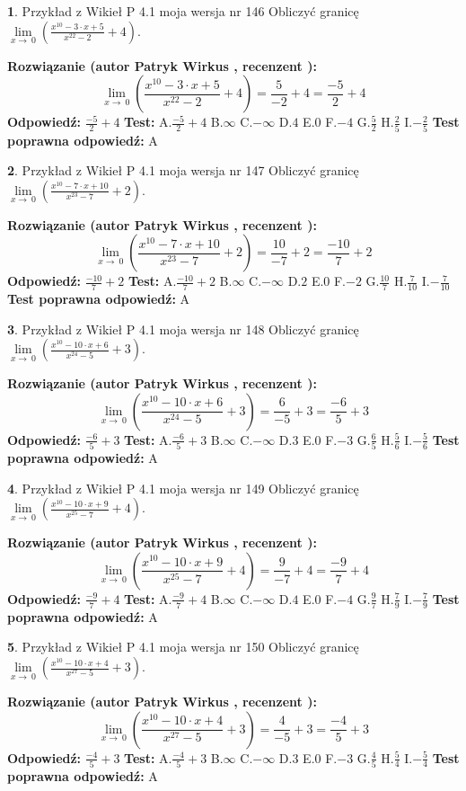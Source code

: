 \documentclass[12pt, a4paper]{article}
\theoremstyle{definition} %
\newtheorem{zad}{}
\newcommand{\zadStart}[1]{\begin{zad}#1\newline}
\newcommand{\zadStop}{\end{zad}}
\newcommand{\rozwStart}[2]{\noindent \textbf{Rozwiązanie (autor #1 , recenzent #2): }\newline}
\newcommand{\rozwStop}{\newline}
\newcommand{\odpStart}{\noindent \textbf{Odpowiedź:}\newline}
\newcommand{\odpStop}{\newline}
\newcommand{\testStart}{\noindent \textbf{Test:}\newline}
\newcommand{\testStop}{\newline}
\newcommand{\kluczStart}{\noindent \textbf{Test poprawna odpowiedź:}\newline}
\newcommand{\kluczStop}{\newline}
\begin{document}
\zadStart{Przykład z Wikieł P 4.1 moja wersja nr 146}
Obliczyć granicę $\lim\limits_{x\to\ 0}(\frac{x^{10}-3 \cdot x +5}{x^{22}-2}+4)$.
\zadStop
\rozwStart{Patryk Wirkus}{}
$$\lim\limits_{x\to\ 0}(\frac{x^{10}-3 \cdot x +5}{x^{22}-2}+4)=\frac{5}{-2}+4=\frac{-5}{2}+4$$
\rozwStop
\odpStart
$\frac{-5}{2}+4$
\odpStop
\testStart
A.$\frac{-5}{2}+4$
B.$\infty$
C.$-\infty$
D.$4$
E.$0$
F.$-4$
G.$\frac{5}{2}$
H.$\frac{2}{5}$
I.$-\frac{2}{5}$
\testStop
\kluczStart
A
\kluczStop



\zadStart{Przykład z Wikieł P 4.1 moja wersja nr 147}
Obliczyć granicę $\lim\limits_{x\to\ 0}(\frac{x^{10}-7 \cdot x +10}{x^{23}-7}+2)$.
\zadStop
\rozwStart{Patryk Wirkus}{}
$$\lim\limits_{x\to\ 0}(\frac{x^{10}-7 \cdot x +10}{x^{23}-7}+2)=\frac{10}{-7}+2=\frac{-10}{7}+2$$
\rozwStop
\odpStart
$\frac{-10}{7}+2$
\odpStop
\testStart
A.$\frac{-10}{7}+2$
B.$\infty$
C.$-\infty$
D.$2$
E.$0$
F.$-2$
G.$\frac{10}{7}$
H.$\frac{7}{10}$
I.$-\frac{7}{10}$
\testStop
\kluczStart
A
\kluczStop



\zadStart{Przykład z Wikieł P 4.1 moja wersja nr 148}
Obliczyć granicę $\lim\limits_{x\to\ 0}(\frac{x^{10}-10 \cdot x +6}{x^{24}-5}+3)$.
\zadStop
\rozwStart{Patryk Wirkus}{}
$$\lim\limits_{x\to\ 0}(\frac{x^{10}-10 \cdot x +6}{x^{24}-5}+3)=\frac{6}{-5}+3=\frac{-6}{5}+3$$
\rozwStop
\odpStart
$\frac{-6}{5}+3$
\odpStop
\testStart
A.$\frac{-6}{5}+3$
B.$\infty$
C.$-\infty$
D.$3$
E.$0$
F.$-3$
G.$\frac{6}{5}$
H.$\frac{5}{6}$
I.$-\frac{5}{6}$
\testStop
\kluczStart
A
\kluczStop



\zadStart{Przykład z Wikieł P 4.1 moja wersja nr 149}
Obliczyć granicę $\lim\limits_{x\to\ 0}(\frac{x^{10}-10 \cdot x +9}{x^{25}-7}+4)$.
\zadStop
\rozwStart{Patryk Wirkus}{}
$$\lim\limits_{x\to\ 0}(\frac{x^{10}-10 \cdot x +9}{x^{25}-7}+4)=\frac{9}{-7}+4=\frac{-9}{7}+4$$
\rozwStop
\odpStart
$\frac{-9}{7}+4$
\odpStop
\testStart
A.$\frac{-9}{7}+4$
B.$\infty$
C.$-\infty$
D.$4$
E.$0$
F.$-4$
G.$\frac{9}{7}$
H.$\frac{7}{9}$
I.$-\frac{7}{9}$
\testStop
\kluczStart
A
\kluczStop



\zadStart{Przykład z Wikieł P 4.1 moja wersja nr 150}
Obliczyć granicę $\lim\limits_{x\to\ 0}(\frac{x^{10}-10 \cdot x +4}{x^{27}-5}+3)$.
\zadStop
\rozwStart{Patryk Wirkus}{}
$$\lim\limits_{x\to\ 0}(\frac{x^{10}-10 \cdot x +4}{x^{27}-5}+3)=\frac{4}{-5}+3=\frac{-4}{5}+3$$
\rozwStop
\odpStart
$\frac{-4}{5}+3$
\odpStop
\testStart
A.$\frac{-4}{5}+3$
B.$\infty$
C.$-\infty$
D.$3$
E.$0$
F.$-3$
G.$\frac{4}{5}$
H.$\frac{5}{4}$
I.$-\frac{5}{4}$
\testStop
\kluczStart
A
\kluczStop
\end{document}
